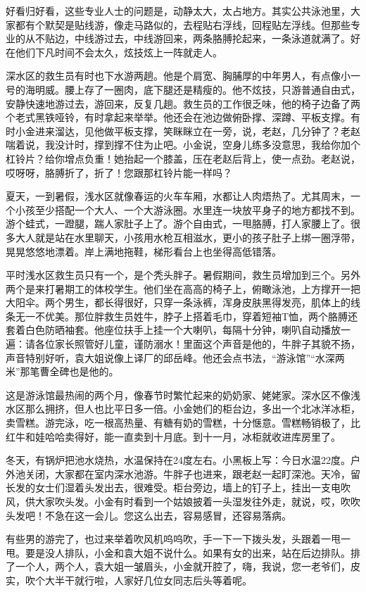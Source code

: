 \documentclass[lang=cn,newtx,12pt,scheme=chinese]{elegantbook}
\begin{document}
好看归好看，这些专业人士的问题是，动静太大，太占地方。其实公共泳池里，大家都有个默契是贴线游，像走马路似的，去程贴右浮线，回程贴左浮线。但那些专业的从不贴边，中线游过去，中线游回来，两条胳膊抡起来，一条泳道就满了。好在他们下凡时间不会太久，炫技炫上一阵就走人。

深水区的救生员有时也下水游两趟。他是个肩宽、胸脯厚的中年男人，有点像小一号的海明威。腰上存了一圈肉，底下腿还是精瘦的。他不炫技，只游普通自由式，安静快速地游过去，游回来，反复几趟。救生员的工作很乏味，他的椅子边备了两个老式黑铁哑铃，有时拿起来举举。他还会在池边做俯卧撑、深蹲、平板支撑。有时小金进来溜达，见他做平板支撑，笑眯眯立在一旁，说，老赵，几分钟了？老赵喘着说，我没计时，撑到撑不住为止吧。小金说，空身儿练多没意思，我给你加个杠铃片？给你增点负重！她抬起一个膝盖，压在老赵后背上，使一点劲。老赵说，哎呀呀，胳膊折了，折了！您跟那杠铃片能一样吗？

夏天，一到暑假，浅水区就像春运的火车车厢，水都让人肉焐热了。尤其周末，一个小孩至少搭配一个大人、一个大游泳圈。水里连一块放平身子的地方都找不到。游个蛙式，一蹬腿，踹人家肚子上了。游个自由式，一甩胳膊，打人家腰上了。很多大人就是站在水里聊天，小孩用水枪互相滋水，更小的孩子肚子上绑一圈浮带，晃晃悠悠地漂着。岸上满地拖鞋，梯形看台上也坐得高低错落。

平时浅水区救生员只有一个，是个秃头胖子。暑假期间，救生员增加到三个。另外两个是来打暑期工的体校学生。他们坐在高高的椅子上，俯瞰泳池，上方撑开一把大阳伞。两个男生，都长得很好，只穿一条泳裤，浑身皮肤黑得发亮，肌体上的线条无一不优美。那位胖救生员姓牛，脖子上搭着毛巾，穿着短袖T恤，两个胳膊还套着白色防晒袖套。他座位扶手上挂一个大喇叭，每隔十分钟，喇叭自动播放一遍：请各位家长照管好儿童，谨防溺水！里面这个声音是他的，牛胖子其貌不扬，声音特别好听，袁大姐说像上译厂的邱岳峰。他还会点书法，“游泳馆”“水深两米”那笔曹全碑也是他的。

这是游泳馆最热闹的两个月，像春节时繁忙起来的奶奶家、姥姥家。深水区不像浅水区那么拥挤，但人也比平日多一倍。小金她们的柜台边，多出一个北冰洋冰柜，卖雪糕。游完泳，吃一根高热量、有糖有奶的雪糕，十分惬意。雪糕畅销极了，比红牛和娃哈哈卖得好，能一直卖到十月底。到十一月，冰柜就收进库房里了。

冬天，有锅炉把池水烧热，水温保持在24度左右。小黑板上写：今日水温22度。户外池关闭，大家都在室内深水池游。牛胖子也进来，跟老赵一起盯深池。天冷，留长发的女士们湿着头发出去，很难受。柜台旁边，墙上的钉子上，挂出一支电吹风，供大家吹头发。小金有时看到一个姑娘披着一头湿发往外走，就说，哎，吹吹头发吧！不急在这一会儿。您这么出去，容易感冒，还容易落病。

有些男的游完了，也过来举着吹风机呜呜吹，手一下一下拨头发，头跟着一甩一甩。要是没人排队，小金和袁大姐不说什么。如果有女的出来，站在后边排队。排了一个人，两个人，袁大姐一皱眉头，小金就开腔了，嗨，我说，您一老爷们，皮实，吹个大半干就行啦，人家好几位女同志后头等着呢。
\end{document}

